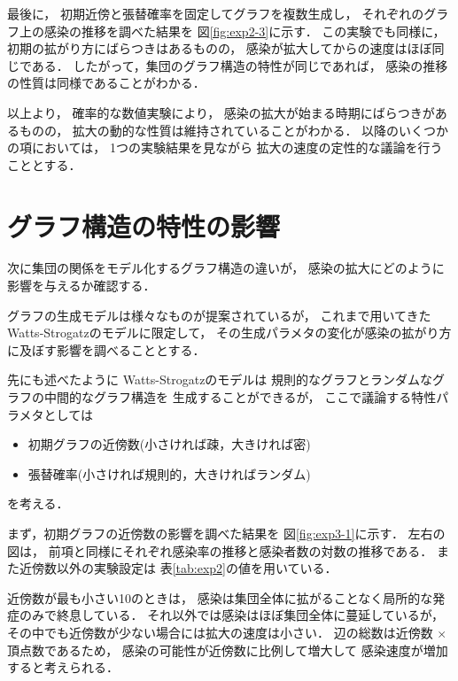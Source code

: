 \documentclass[10pt,oneside]{scrartcl}
\begin{document}
最後に，
初期近傍と張替確率を固定してグラフを複数生成し，
それぞれのグラフ上の感染の推移を調べた結果を
図\ref{fig:exp2-3}に示す．
この実験でも同様に，
初期の拡がり方にばらつきはあるものの，
感染が拡大してからの速度はほぼ同じである．
したがって，集団のグラフ構造の特性が同じであれば，
感染の推移の性質は同様であることがわかる．

\begin{figure*}%
  \centering
\end{figure*}

以上より，
確率的な数値実験により，
感染の拡大が始まる時期にばらつきがあるものの，
拡大の動的な性質は維持されていることがわかる．
以降のいくつかの項においては，
1つの実験結果を見ながら
拡大の速度の定性的な議論を行うこととする．

\section{グラフ構造の特性の影響}
\label{sec:org1f04a86}

次に集団の関係をモデル化するグラフ構造の違いが，
感染の拡大にどのように影響を与えるか確認する．

グラフの生成モデルは様々なものが提案されているが，
これまで用いてきた
Watts-Strogatzのモデルに限定して，
その生成パラメタの変化が感染の拡がり方に及ぼす影響を調べることとする．

先にも述べたように
Watts-Strogatzのモデルは
規則的なグラフとランダムなグラフの中間的なグラフ構造を
生成することができるが，
ここで議論する特性パラメタとしては
\begin{itemize}
\item 初期グラフの近傍数(小さければ疎，大きければ密)
\item 張替確率(小さければ規則的，大きければランダム)
\end{itemize}
を考える．

まず，初期グラフの近傍数の影響を調べた結果を
図\ref{fig:exp3-1}に示す．
左右の図は，
前項と同様にそれぞれ感染率の推移と感染者数の対数の推移である．
また近傍数以外の実験設定は
表\ref{tab:exp2}の値を用いている．

近傍数が最も小さい10のときは，
感染は集団全体に拡がることなく局所的な発症のみで終息している．
それ以外では感染はほぼ集団全体に蔓延しているが，
その中でも近傍数が少ない場合には拡大の速度は小さい．
辺の総数は近傍数 \(\times\) 頂点数であるため，
感染の可能性が近傍数に比例して増大して
感染速度が増加すると考えられる．
\end{document}
